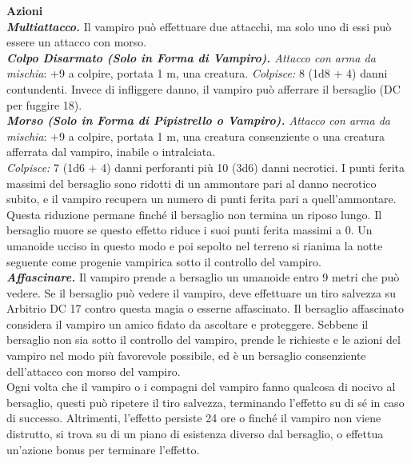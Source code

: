 \begin{multicols}{2}
\smallskip\textbf{Azioni}\\
\emph{\textbf{Multiattacco.}} Il vampiro può effettuare due attacchi, ma solo uno di essi può essere un attacco con morso.\\
\emph{\textbf{Colpo Disarmato (Solo in Forma di Vampiro).} Attacco con arma da mischia}: +9 a colpire, portata 1 m, una creatura. \emph{Colpisce:} 8 (1d8 + 4) danni contundenti. Invece di infliggere danno, il vampiro può afferrare il bersaglio (DC per fuggire 18).\\
\emph{\textbf{Morso (Solo in Forma di Pipistrello o Vampiro).} Attacco con arma da mischia}: +9 a colpire, portata 1 m, una creatura consenziente o una creatura afferrata dal vampiro, inabile o intralciata.\\

\emph{Colpisce:} 7 (1d6 + 4) danni perforanti più 10 (3d6) danni necrotici. I punti ferita massimi del bersaglio sono ridotti di un ammontare pari al danno necrotico subito, e il vampiro recupera un numero di punti ferita pari a quell'ammontare. Questa riduzione permane finché il bersaglio non termina un riposo lungo. Il bersaglio muore se questo effetto riduce i suoi punti ferita massimi a 0. Un umanoide ucciso in questo modo e poi sepolto nel terreno si rianima la notte seguente come progenie vampirica sotto il controllo del vampiro. \\

\emph{\textbf{Affascinare.}} Il vampiro prende a bersaglio un umanoide entro 9 metri che può vedere. Se il bersaglio può vedere il vampiro, deve effettuare un tiro salvezza su Arbitrio DC 17 contro questa magia o esserne affascinato. Il bersaglio affascinato considera il vampiro un amico fidato da ascoltare e proteggere. Sebbene il bersaglio non sia sotto il controllo del vampiro, prende le richieste e le azioni del vampiro nel modo più favorevole possibile, ed è un bersaglio consenziente dell'attacco con morso del vampiro.\\

Ogni volta che il vampiro o i compagni del vampiro fanno qualcosa di nocivo al bersaglio, questi può ripetere il tiro salvezza, terminando l'effetto su di sé in caso di successo. Altrimenti, l'effetto persiste 24 ore o finché il vampiro non viene distrutto, si trova su di un piano di esistenza diverso dal bersaglio, o effettua un'azione bonus per terminare l'effetto.\\


\end{multicols}
